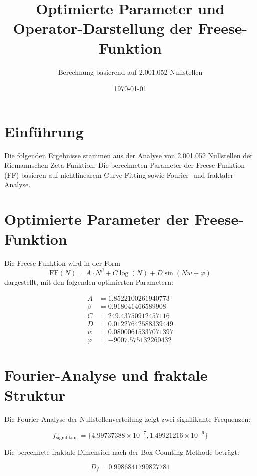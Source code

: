 \documentclass[a4paper,12pt]{article}
\title{Optimierte Parameter und Operator-Darstellung der Freese-Funktion}
\author{Berechnung basierend auf 2.001.052 Nullstellen}
\date{\today}
\begin{document}
\maketitle

\section{Einführung}
Die folgenden Ergebnisse stammen aus der Analyse von 2.001.052 Nullstellen der Riemannschen Zeta-Funktion. Die berechneten Parameter der Freese-Funktion (FF) basieren auf nichtlinearem Curve-Fitting sowie Fourier- und fraktaler Analyse.

\section{Optimierte Parameter der Freese-Funktion}

Die Freese-Funktion wird in der Form
\begin{equation}
    \text{FF}(N) = A \cdot N^{\beta} + C \log(N) + D \sin(N w + \varphi)
\end{equation}
dargestellt, mit den folgenden optimierten Parametern:

\begin{align*}
    A &= 1.8522100261940773 \\
    \beta &= 0.918041466589908 \\
    C &= 249.43750912457116 \\
    D &= 0.01227642588339449 \\
    w &= 0.08000615337071397 \\
    \varphi &= -9007.575132260432
\end{align*}

\section{Fourier-Analyse und fraktale Struktur}
Die Fourier-Analyse der Nullstellenverteilung zeigt zwei signifikante Frequenzen:

\begin{equation}
    f_{\text{signifikant}} = \{4.99737388 \times 10^{-7}, 1.49921216 \times 10^{-6} \}
\end{equation}

Die berechnete fraktale Dimension nach der Box-Counting-Methode beträgt:

\begin{equation}
    D_f = 0.9986841799827781
\end{equation}
\end{document}
